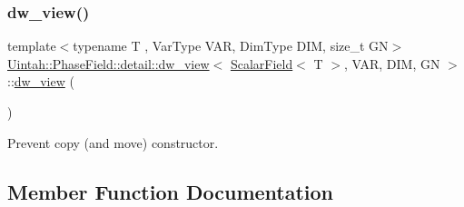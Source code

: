 \subsubsection{\texorpdfstring{dw\+\_\+view()}{dw\_view()}\hspace{0.1cm}{\footnotesize\ttfamily [3/3]}}
{\footnotesize\ttfamily template$<$typename T , Var\+Type V\+AR, Dim\+Type D\+IM, size\+\_\+t GN$>$ \\
\hyperlink{classUintah_1_1PhaseField_1_1detail_1_1dw__view}{Uintah\+::\+Phase\+Field\+::detail\+::dw\+\_\+view}$<$ \hyperlink{structUintah_1_1PhaseField_1_1ScalarField}{Scalar\+Field}$<$ T $>$, V\+AR, D\+IM, GN $>$\+::\hyperlink{classUintah_1_1PhaseField_1_1detail_1_1dw__view}{dw\+\_\+view} (\begin{DoxyParamCaption}\item[{const \hyperlink{classUintah_1_1PhaseField_1_1detail_1_1dw__view}{dw\+\_\+view}$<$ \hyperlink{structUintah_1_1PhaseField_1_1ScalarField}{Scalar\+Field}$<$ T $>$, V\+AR, D\+IM, GN $>$ \&}]{ }\end{DoxyParamCaption})\hspace{0.3cm}{\ttfamily [delete]}}



Prevent copy (and move) constructor. 



\subsection{Member Function Documentation}
\mbox{\label{classUintah_1_1PhaseField_1_1detail_1_1dw__view_3_01ScalarField_3_01T_01_4_00_01VAR_00_01DIM_00_01GN_01_4_ae8805279b2994368f8a16bcfc4a5dad2}} 
